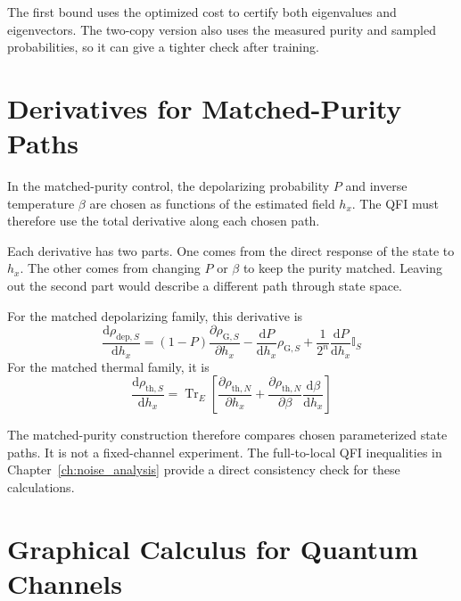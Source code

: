 The first bound uses the optimized cost to certify both eigenvalues and eigenvectors.  The two-copy version also uses the measured purity and sampled probabilities, so it can give a tighter check after training.

\section{Derivatives for Matched-Purity Paths}
\label{app:matched_purity_derivatives}

In the matched-purity control, the depolarizing probability $P$ and inverse temperature $\beta$ are chosen as functions of the estimated field $h_x$.  The QFI must therefore use the total derivative along each chosen path.

Each derivative has two parts.  One comes from the direct response of the state to $h_x$.  The other comes from changing $P$ or $\beta$ to keep the purity matched.  Leaving out the second part would describe a different path through state space.

For the matched depolarizing family, this derivative is
\begin{equation}
    \frac{\mathrm{d}\rho_{\mathrm{dep},S}}{\mathrm{d}h_x}
    =
    (1-P)\frac{\partial\rho_{\mathrm{G},S}}{\partial h_x}
    -\frac{\mathrm{d}P}{\mathrm{d}h_x}\rho_{\mathrm{G},S}
    +\frac{1}{2^n}\frac{\mathrm{d}P}{\mathrm{d}h_x}\mathbb{I}_S
    \label{eq:matched_depolarizing_derivative}
\end{equation}
For the matched thermal family, it is
\begin{equation}
    \frac{\mathrm{d}\rho_{\mathrm{th},S}}{\mathrm{d}h_x}
    =
    \operatorname{Tr}_E\!\left[
        \frac{\partial\rho_{\mathrm{th},N}}{\partial h_x}
        +\frac{\partial\rho_{\mathrm{th},N}}{\partial\beta}
        \frac{\mathrm{d}\beta}{\mathrm{d}h_x}
        \right]
    \label{eq:matched_thermal_derivative}
\end{equation}

The matched-purity construction therefore compares chosen parameterized state paths.  It is not a fixed-channel experiment.  The full-to-local QFI inequalities in Chapter~\ref{ch:noise_analysis} provide a direct consistency check for these calculations.


\section{Graphical Calculus for Quantum Channels}
\label{app:noise_graphical_calculus}

